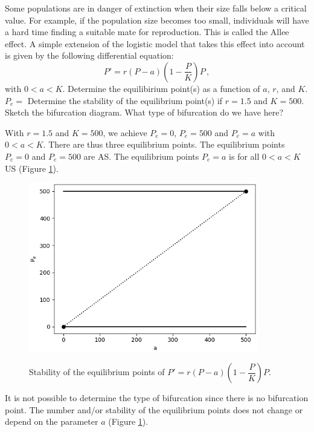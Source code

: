 \begin{Exercise} Some populations are in danger of extinction when their size     falls below a critical value. For example, if the population size becomes     too small, individuals will have a hard time finding a suitable mate for     reproduction. This is called the Allee effect. A simple extension of the     logistic model that takes this effect into account is given by the     following differential equation:
	$$
	P' = r\left(P - a\right)\left(1 - \dfrac{P}{K}\right)P\,,
	$$
with $0 < a < K$.
		\Question Determine the equilibirium point(s) as a function of $a$, $r$, and $K$.\\[0.5cm]
		$P_e = $\vspace*{1cm}
		\Question Determine the stability of the equilibrium point(s) if $r = 1.5$ and $K = 500$. %
		\Question Sketch the bifurcation diagram. What type of bifurcation do we have here?\\[5cm]
\end{Exercise}

\begin{Answer}
    \Question With $r = 1.5$ and $K = 500$, we achieve $P_e = 0$, $P_e = 500$ and $P_e = a$ with $0 < a < K$. There are thus three equilibrium points.
    \Question The equilibrium points $P_e = 0$ and $P_e = 500$ are AS. The equilibrium points $P_e = a$ is for all $0 < a < K$ US (Figure \ref{fig:oefening2_4_3_2}).
    
    \begin{figure}[H]
	\centering				\includegraphics[width=10cm]{oefening2_4_3_2.png}\\
	\caption{Stability of the equilibrium points of $P' = r\left(P - a\right)\left(1 - \dfrac{P}{K}\right)P$. \label{fig:oefening2_4_3_2}}
    \end{figure}
    
    \Question It is not possible to determine the type of bifurcation since there is no bifurcation point. The number and/or stability of the equilibrium points does not change or depend on the parameter $a$ (Figure \ref{fig:oefening2_4_3_2}).
    \EndCurrentQuestion
\end{Answer}	
	
